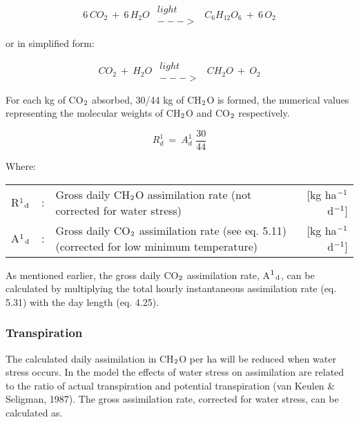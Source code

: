 \begin{equation}
6\, CO _{2} ~+~ 6\, H _{2} O ~\,\begin{array}{c}{light}  \\
{--->}\end{array} \, ~C _{6} H _{12} O _{6} ~+~ 6\, O _{2}
\end{equation}

or in simplified form:

\begin{equation}
CO _{2} ~+~ H _{2} O~\,\begin{array}{c}{light}  \\
{--->}\end{array} \, ~ CH _{2} O ~+~ O _{2}
\end{equation}


For each kg of CO$_{{\rm 2}}$ absorbed, 30/44 kg of CH$_{{\rm 2}}$O is formed, the numerical values
representing the molecular weights of CH$_{{\rm 2}}$O and CO$_{{\rm 2}}$ respectively.

\begin{equation}
R _{d}^{1} ~=~ A _{d}^{1} \,\,{\frac{30}{44}}
\end{equation}

Where:\\
\begin{tabularx}{\textwidth}{llXr}
R$^{{\rm 1}}$$_{{\rm d}}$ &:& Gross daily CH$_{{\rm 2}}$O assimilation rate 
   (not corrected for water stress) &   [kg ha$^{{\rm -1}}$ d$^{{\rm -1}}$]\\
A$^{{\rm 1}}$$_{{\rm d}}$ &:& Gross daily CO$_{{\rm 2}}$ assimilation rate 
   (see eq. 5.11) (corrected for low minimum temperature)   &    [kg ha$^{{\rm -1}}$ d$^{{\rm -1}}$]\\   
\end{tabularx}
 
As mentioned earlier, the gross daily CO$_{{\rm 2}}$ assimilation rate, A$^{{\rm 1}}$$_{{\rm d}}$, can be calculated by
multiply\-ing the total hourly instantaneous assimilation rate (eq. 5.31) with the day length
(eq. 4.25). 

\subsubsection{Transpiration}
The calculated daily assimilation in CH$_{{\rm 2}}$O per ha will be reduced when water stress
occurs. In the model the effects of water stress on assimilation are related to the ratio of
actual transpiration and potential transpiration (van Keulen \& Seligman, 1987).
The gross assimilation rate, corrected for water stress, can be calculated as.

